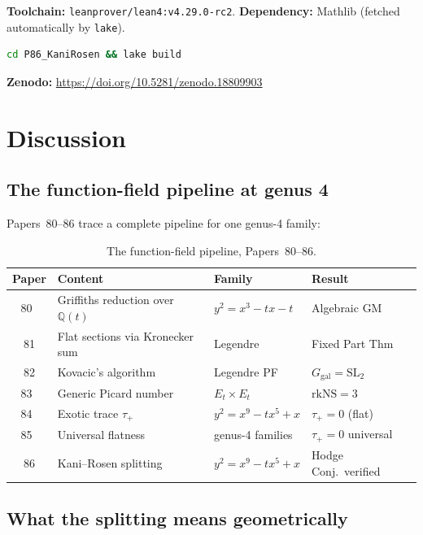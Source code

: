 \documentclass[11pt]{article}
\theoremstyle{plain}
\theoremstyle{definition}
\theoremstyle{remark}
\newcommand{\Q}{\mathbb{Q}}
\newcommand{\SL}{\mathrm{SL}}
\newcommand{\rk}{\mathrm{rk}}
\newcommand{\Ggal}{G_{\mathrm{gal}}}
\newcommand{\NS}{\mathrm{NS}}
\begin{document}
\textbf{Toolchain:} \texttt{leanprover/lean4:v4.29.0-rc2}.
\textbf{Dependency:} Mathlib (fetched automatically by \texttt{lake}).

\begin{lstlisting}[language=bash,style=leanstyle,keywords={}]
cd P86_KaniRosen && lake build
\end{lstlisting}

\noindent
\textbf{Zenodo:} \url{https://doi.org/10.5281/zenodo.18809903}

\section{Discussion}
\label{sec:discussion}

\subsection{The function-field pipeline at genus 4}

Papers~80--86 trace a complete pipeline for one genus-4 family:

\begin{table}[h]
\centering
\small
\begin{tabular}{c l l l}
\toprule
\textbf{Paper} & \textbf{Content} & \textbf{Family} & \textbf{Result} \\
\midrule
80~\cite{P80} & Griffiths reduction over $\Q(t)$ & $y^2 = x^3 - tx - t$ & Algebraic GM \\
81 & Flat sections via Kronecker sum & Legendre & Fixed Part Thm \\
82 & Kovacic's algorithm & Legendre PF & $\Ggal = \SL_2$ \\
83~\cite{P83} & Generic Picard number & $E_t \times E_t$ & $\rk\NS = 3$ \\
84~\cite{P84} & Exotic trace $\tau_+$ & $y^2 = x^9 - tx^5 + x$ & $\tau_+ = 0$ (flat) \\
85~\cite{P85} & Universal flatness & genus-4 families & $\tau_+ = 0$ universal \\
86 & Kani--Rosen splitting & $y^2 = x^9 - tx^5 + x$ & Hodge Conj.\ verified \\
\bottomrule
\end{tabular}
\caption{The function-field pipeline, Papers~80--86.}
\label{tab:pipeline}
\end{table}

\subsection{What the splitting means geometrically}
\end{document}
